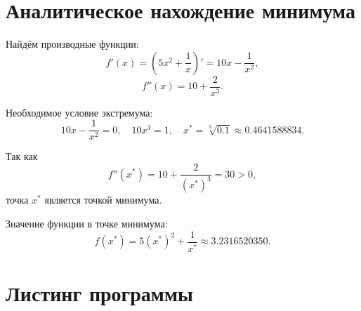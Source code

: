 \documentclass[12pt, letterpaper]{article}
\begin{document}
\section{Аналитическое нахождение минимума}
Найдём производные функции:
\[
    f'(x) = \left(5x^2 + \frac{1}{x}\right)' = 10x - \frac{1}{x^2},
\]
\[
    f''(x) = 10 + \frac{2}{x^3}.
\]

Необходимое условие экстремума:
\[
    10x - \frac{1}{x^2} = 0,
    \quad
    10x^3 = 1,
    \quad
    x^* = \sqrt[3]{0.1} \approx 0.4641588834.
\]

Так как
\[
    f''(x^*) = 10 + \frac{2}{(x^*)^3} = 30 > 0,
\]
точка $x^*$ является точкой минимума.

Значение функции в точке минимума:
\[
    f(x^*) = 5(x^*)^2 + \frac{1}{x^*}
    \approx 3.2316520350.
\]

\section{Листинг программы}
\end{document}
